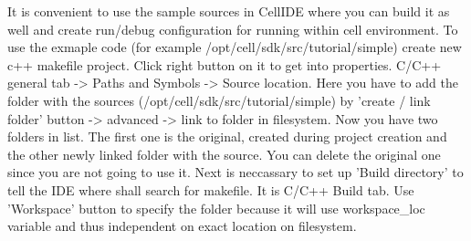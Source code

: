 It is convenient to use the sample sources in CellIDE where you can build it as well and create run/debug configuration for running within cell environment. To use the exmaple code (for example /opt/cell/sdk/src/tutorial/simple) create new c++ makefile project. Click right button on it to get into properties. C/C++ general tab -> Paths and Symbols -> Source location. Here you have to add the folder with the sources (/opt/cell/sdk/src/tutorial/simple) by 'create / link folder' button -> advanced -> link to folder in filesystem. Now you have two folders in list. The first one is the original, created during project creation and the other newly linked folder with the source. You can delete the original one since you are not going to use it.
Next is neccassary to set up 'Build directory' to tell the IDE where shall search for makefile. It is C/C++ Build tab. Use 'Workspace' button to specify the folder because it will use workspace_loc variable and thus independent on exact location on filesystem.  
